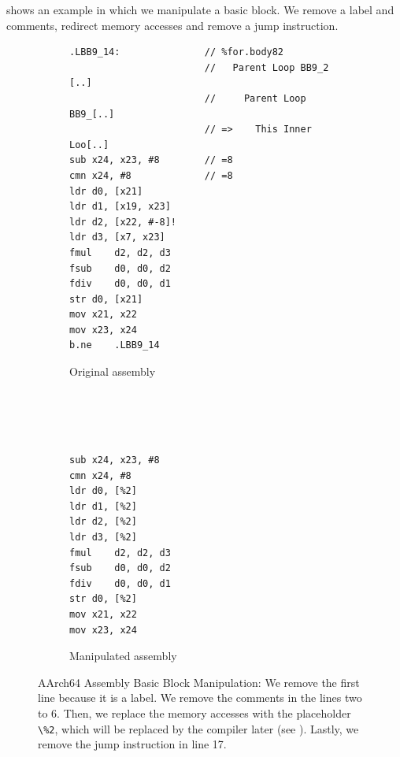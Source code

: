  shows an example in which we manipulate a basic block.
We remove a label and comments, redirect memory accesses and remove a jump instruction.
\begin{figure}
    \begin{subfigure}{0.65\textwidth}
        \begin{lstlisting}
.LBB9_14:               // %for.body82
                        //   Parent Loop BB9_2 [..]
                        //     Parent Loop BB9_[..]
                        // =>    This Inner Loo[..]
sub	x24, x23, #8        // =8
cmn	x24, #8             // =8
ldr	d0, [x21]
ldr	d1, [x19, x23]
ldr	d2, [x22, #-8]!
ldr	d3, [x7, x23]
fmul	d2, d2, d3
fsub	d0, d0, d2
fdiv	d0, d0, d1
str	d0, [x21]
mov	x21, x22
mov	x23, x24
b.ne	.LBB9_14
        \end{lstlisting}
        \caption{Original assembly}
    \end{subfigure}
    \hfill
    \begin{subfigure}{0.3\textwidth}
        \begin{lstlisting}[showlines=true]




sub	x24, x23, #8
cmn	x24, #8
ldr	d0, [%2]
ldr	d1, [%2]
ldr	d2, [%2]
ldr	d3, [%2]
fmul	d2, d2, d3
fsub	d0, d0, d2
fdiv	d0, d0, d1
str	d0, [%2]
mov	x21, x22
mov	x23, x24

        \end{lstlisting}
        \caption{Manipulated assembly}
    \end{subfigure}
    \caption[Assembly Basic Block Manipulation]{AArch64 Assembly Basic Block Manipulation:
    We remove the first line because it is a label.
    We remove the comments in the lines two to 6.
    Then, we replace the memory accesses with the placeholder \lstinline|\%2|, which will be replaced by the compiler later (see ).
    Lastly, we remove the jump instruction in line 17.}
    \label{fig:approach:bb-cleaning}
\end{figure}

